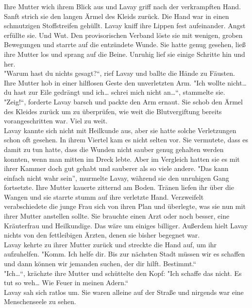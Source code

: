 Ihre Mutter wich ihrem Blick aus und Lavay griff nach der verkrampften Hand. Sanft strich sie den 
langen Ärmel des Kleids zurück. Die Hand war in einen schmutzigen Stoffstreifen gehüllt. Lavay 
kniff ihre Lippen fest aufeinander. Angst erfüllte sie. Und Wut. Den provisorischen Verband löste 
sie mit wenigen, groben Bewegungen und starrte auf die entzündete Wunde. Sie hatte genug gesehen, 
ließ ihre Mutter los und sprang auf die Beine. Unruhig lief sie einige Schritte hin und her.\\
"Warum hast du nichts gesagt?``, rief Lavay und ballte die Hände zu Fäusten. \\
Ihre Mutter hob in einer hilflosen Geste den unverletzten Arm. "Ich wollte nicht… du hast zur Eile 
gedrängt und ich… schrei mich nicht an…``, stammelte sie.\\
"Zeig!``, forderte Lavay barsch und packte den Arm ernaut. Sie schob den Ärmel des Kleides zurück 
um zu überprüfen, wie weit die Blutvergiftung bereits vorangeschritten war. Viel zu weit.\\
Lavay kannte sich nicht mit Heilkunde aus, aber sie hatte solche Verletzungen schon oft gesehen. In 
ihrem Viertel kam es nicht selten vor. Sie vermutete, dass es damit zu tun hatte, dass die Wunden 
nicht sauber genug gehalten werden konnten, wenn man mitten im Dreck lebte. Aber im Vergleich 
hatten sie es mit ihrer Kammer doch gut gehabt und sauberer als so viele andere.
"Das kann einfach nicht wahr sein'', murmelte Lavay, während sie den unruhigen Gang fortsetzte.
Ihre Mutter kauerte zitternd am Boden. Tränen liefen ihr über die Wangen und sie starrte stumm auf 
ihre verletzte Hand. Verzweifelt verabschiedete die junge Frau sich von ihren Plan und überlegte, 
was sie nun mit ihrer Mutter anstellen sollte. Sie brauchte einen Arzt oder noch besser, eine 
Kräuterfrau und Heilkundige. Das wäre um einiges billiger. Außerdem hielt Lavay nichts von den 
fettleibigen Ärzten, denen sie bisher begegnet war.\\ 
Lavay kehrte zu ihrer Mutter zurück und streckte die Hand auf, um ihr aufzuhelfen. 
"Komm. Ich helfe dir. Bis zur nächsten Stadt müssen wir es schaffen und dann können wir jemanden 
suchen, der dir hilft. Bestimmt.``\\
"Ich…``, krächzte ihre Mutter und schüttelte den Kopf: "Ich schaffe das nicht. Es tut so weh… Wie 
Feuer in meinen Adern.``\\
Lavay sah sich ratlos um. Sie waren alleine auf der Straße und nirgends war eine Menschenseele zu 
sehen. \\
